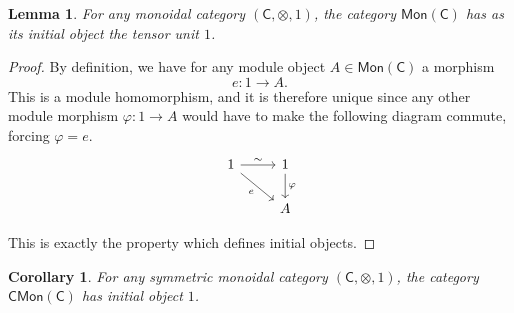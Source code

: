 \documentclass[a4paper,10pt]{scrreprt}
\theoremstyle{definition}
\theoremstyle{plain}
\newtheorem{lemma}{Lemma}[section]
\newtheorem{corollary}{Corollary}[section]
\theoremstyle{remark}
\begin{document}
\begin{lemma}
  \label{lemma:unitobjectisinitialincmon}
  For any monoidal category $(\mathsf{C}, \otimes, 1)$, the category $\mathsf{Mon}(\mathsf{C})$ has as its initial object the tensor unit $1$.
\end{lemma}
\begin{proof}
  By definition, we have for any module object $A \in \mathsf{Mon}(\mathsf{C})$ a morphism 
  \begin{equation*}
    e\colon 1 \to A.
  \end{equation*}
  This is a module homomorphism, and it is therefore unique since any other module morphism $\varphi\colon 1 \to A$ would have to make the following diagram commute, forcing $\varphi = e$.
  \begin{equation*}
    \begin{tikzcd}
      1
      \arrow[r, "\sim"]
      \arrow[dr, swap, "e"]
      & 1
      \arrow[d, "\varphi"]
      \\
      & A
    \end{tikzcd}
  \end{equation*}

  This is exactly the property which defines initial objects.
\end{proof}

\begin{corollary}
  For any symmetric monoidal category $(\mathsf{C}, \otimes, 1)$, the category $\mathsf{CMon}(\mathsf{C})$ has initial object $1$.
\end{corollary}
\end{document}
